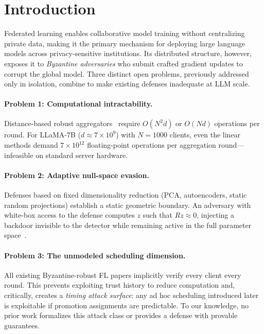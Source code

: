 \documentclass{article}
\begin{document}
\section{Introduction}
\label{sec:intro}

Federated learning enables collaborative model training without centralizing
private data, making it the primary mechanism for deploying large language
models across privacy-sensitive institutions.
Its distributed structure, however, exposes it to \emph{Byzantine adversaries}
who submit crafted gradient updates to corrupt the global model.
Three distinct open problems, previously addressed only in isolation, combine to
make existing defenses inadequate at LLM scale.

\paragraph{Problem 1: Computational intractability.}
Distance-based robust aggregators~\citep{blanchard2017machine,
pillutla2022robust, elmhamdi2018hidden} require $O(N^2 d)$ or $O(Nd)$
operations per round.
For LLaMA-7B ($d \approx 7 \times 10^9$) with $N=1000$ clients, even the
linear methods demand $7 \times 10^{12}$ floating-point operations per
aggregation round---infeasible on standard server hardware.

\paragraph{Problem 2: Adaptive null-space evasion.}
Defenses based on fixed dimensionality reduction (PCA, autoencoders, static
random projections) establish a static geometric boundary.
An adversary with white-box access to the defense computes $z$ such that
$Rz \approx 0$, injecting a backdoor invisible to the detector while remaining
active in the full parameter space~\citep{bagdasaryan2020backdoor}.

\paragraph{Problem 3: The unmodeled scheduling dimension.}
All existing Byzantine-robust FL papers implicitly verify every client every
round.
This prevents exploiting trust history to reduce computation and, critically,
creates a \emph{timing attack surface}: any ad hoc scheduling introduced later
is exploitable if promotion assignments are predictable.
To our knowledge, no prior work formalizes this attack class or provides a
defense with provable guarantees.
\end{document}
